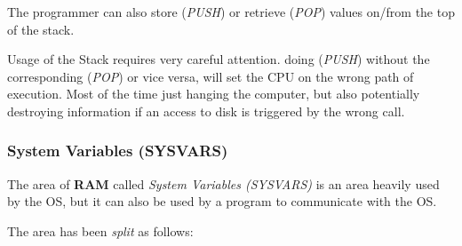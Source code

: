         The programmer can also store (\textit{PUSH}) or retrieve (\textit{POP})
        values on/from the top of the stack.

        Usage of the Stack requires very careful attention. doing (\textit{PUSH})
        without the corresponding (\textit{POP}) or vice versa, will set the CPU on
        the wrong path of execution. Most of the time just hanging the computer, but
        also potentially destroying information if an access to disk is triggered by
        the wrong call.

        \subsubsection{System Variables (SYSVARS)}
        \label{sec:ram_memmap}

        The area of \textbf{RAM} called \textit{System Variables (SYSVARS)} is an 
        area heavily used by the OS, but it can also be used by a program to
        communicate with the OS.

        The area has been \textit{split} as follows:

